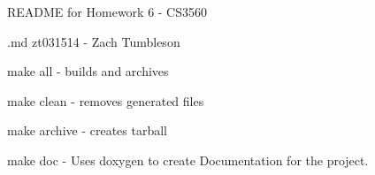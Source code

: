 R\+E\+A\+D\+ME for Homework 6 -\/ C\+S3560

.md zt031514 -\/ Zach Tumbleson

make all -\/ builds and archives

make clean -\/ removes generated files

make archive -\/ creates tarball

make doc -\/ Uses doxygen to create Documentation for the project. 